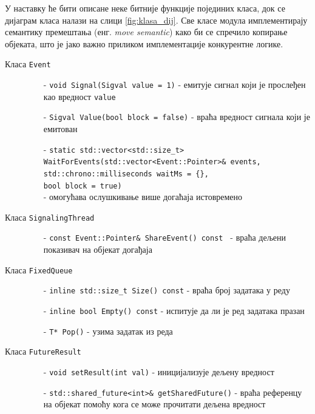 \documentclass[12pt,oneside]{memoir}
\begin{document}
У наставку ће бити описане неке битније функције појединих класа, док се дијаграм класа налази на слици \ref{fig:klasa_dij}. Све класе модула имплементирају семантику премештања (енг. \textit{move semantic}) како би се спречило копирање објеката, што је јако важно приликом имплементације конкурентне логике. 

\begin{description}
	\item[Класа \texttt{Event}]\leavevmode
		\begin{itemize}
			\item[-] \texttt{void Signal(Sigval value = 1)} - емитује сигнал који је прослеђен као вредност \texttt{value}
			\item[-] \texttt{Sigval Value(bool block = false)} - враћа вредност сигнала који је емитован  
			\item[-] \texttt{static std::vector<std::size\_t>
			\\
			 WaitForEvents(std::vector<Event::Pointer>\& events,
			 \\
			 std::chrono::milliseconds waitMs = \{\}, 
			 \\ 
			 bool block = true)} 
			 \\ - омогућава ослушкивање више догаћаја истовремено
		\end{itemize}			
	\item[Класа \texttt{SignalingThread}]\leavevmode
		\begin{itemize}
			\item[-] \texttt{const Event::Pointer\& ShareEvent() const } - враћа дељени показивач на објекат догађаја 	
		\end{itemize}			
	\item[Класа \texttt{FixedQueue}]\leavevmode
		\begin{itemize}
			\item[-] \texttt{inline std::size\_t Size() const} - враћа број задатака у реду
			\item[-] \texttt{inline bool Empty() const} - испитује да ли је ред задатака 	празан	
			\item[-] \texttt{T* Pop()} - узима задатак из реда 
		\end{itemize}			
	\item[Класа \texttt{FutureResult}]\leavevmode
		\begin{itemize}
			\item[-] \texttt{void setResult(int val)} - иницијализује дељену вредност
			\item[-] \texttt{std::shared\_future<int>\& getSharedFuture()} - враћа референцу на објекат помоћу кога се може прочитати дељена вредност			

\end{itemize}
\end{description}
\end{document}
